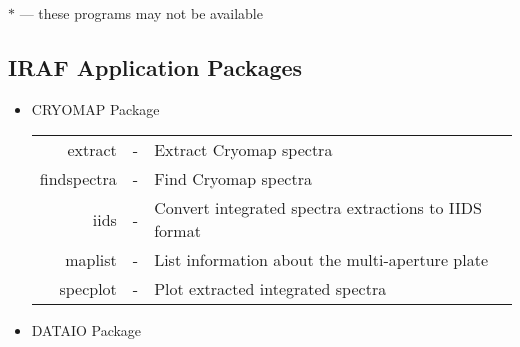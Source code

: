 \vskip 2cm \noindent
$*$ --- these programs may not be available
\clearpage

\subsection{IRAF Application Packages}

\begin{itemize}

\item CRYOMAP Package \\

\begin{tabular}{rcl}

        extract & - & Extract Cryomap spectra\\
    findspectra & - & Find Cryomap spectra\\
           iids & - & Convert integrated spectra extractions to IIDS format\\
        maplist & - & List information about the multi-aperture plate\\
       specplot & - & Plot extracted integrated spectra

\end{tabular}

\item DATAIO Package \\

\begin{tabular}{rcl}


\end{tabular}
\end{itemize}
